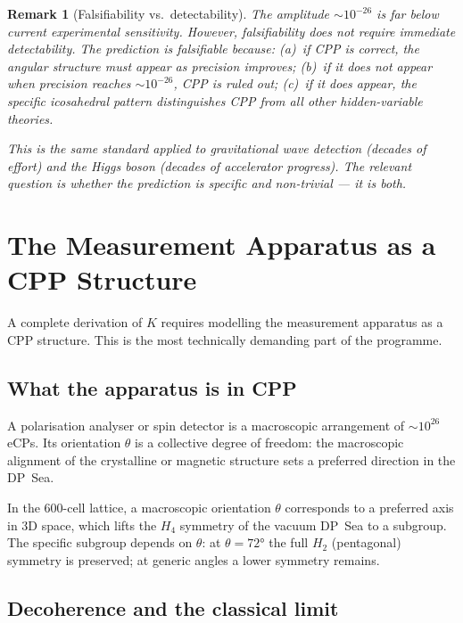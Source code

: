 \documentclass[11pt,a4paper]{article}
\newtheorem{remark}[theorem]{Remark}
\begin{document}
\begin{remark}[Falsifiability vs.\ detectability]
The amplitude $\sim 10^{-26}$ is far below current experimental
sensitivity.  However, falsifiability does not require immediate
detectability.  The prediction is falsifiable because:
(a)~if CPP is correct, the angular structure \emph{must} appear as
precision improves; (b)~if it does not appear when precision reaches
$\sim 10^{-26}$, CPP is ruled out; (c)~if it does appear, the
specific icosahedral pattern distinguishes CPP from all other
hidden-variable theories.

This is the same standard applied to gravitational wave detection
(decades of effort) and the Higgs boson (decades of accelerator
progress).  The relevant question is whether the prediction is
\emph{specific} and \emph{non-trivial} --- it is both.
\end{remark}

\section{The Measurement Apparatus as a CPP Structure}
\label{sec:apparatus}

A complete derivation of $K$ requires modelling the measurement
apparatus as a CPP structure.  This is the most technically demanding
part of the programme.

\subsection{What the apparatus is in CPP}

A polarisation analyser or spin detector is a macroscopic arrangement
of $\sim 10^{26}$ eCPs.  Its orientation $\theta$ is a collective
degree of freedom: the macroscopic alignment of the crystalline or
magnetic structure sets a preferred direction in the DP~Sea.

In the 600-cell lattice, a macroscopic orientation $\theta$ corresponds
to a preferred axis in 3D space, which lifts the $H_4$ symmetry of
the vacuum DP~Sea to a subgroup.  The specific subgroup depends on
$\theta$: at $\theta = 72°$ the full $H_2$ (pentagonal) symmetry is
preserved; at generic angles a lower symmetry remains.

\subsection{Decoherence and the classical limit}
\end{document}
